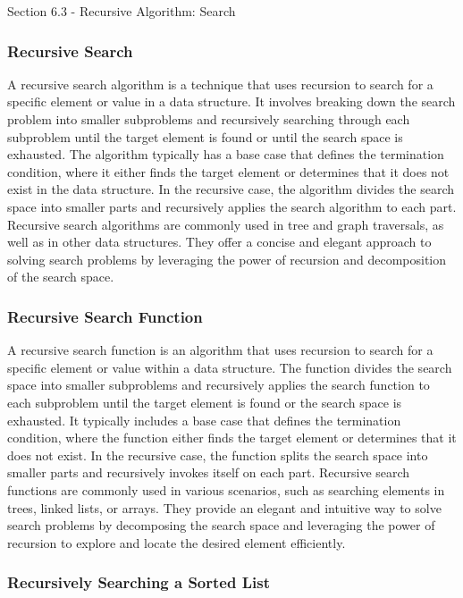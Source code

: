 \begin{notes}{Section 6.3 - Recursive Algorithm: Search}
    \subsubsection*{Recursive Search}

    A recursive search algorithm is a technique that uses recursion to search for a specific element or value in a data structure. It involves breaking down the search problem into smaller subproblems and recursively searching through each subproblem until the target element is found or until 
    the search space is exhausted. The algorithm typically has a base case that defines the termination condition, where it either finds the target element or determines that it does not exist in the data structure. In the recursive case, the algorithm divides the search space into smaller parts 
    and recursively applies the search algorithm to each part. Recursive search algorithms are commonly used in tree and graph traversals, as well as in other data structures. They offer a concise and elegant approach to solving search problems by leveraging the power of recursion and decomposition 
    of the search space.
    
    \subsubsection*{Recursive Search Function}
    
    A recursive search function is an algorithm that uses recursion to search for a specific element or value within a data structure. The function divides the search space into smaller subproblems and recursively applies the search function to each subproblem until the target element is found or the 
    search space is exhausted. It typically includes a base case that defines the termination condition, where the function either finds the target element or determines that it does not exist. In the recursive case, the function splits the search space into smaller parts and recursively invokes itself 
    on each part. Recursive search functions are commonly used in various scenarios, such as searching elements in trees, linked lists, or arrays. They provide an elegant and intuitive way to solve search problems by decomposing the search space and leveraging the power of recursion to explore and locate 
    the desired element efficiently.
    
    \subsubsection*{Recursively Searching a Sorted List}
    

\end{notes}
